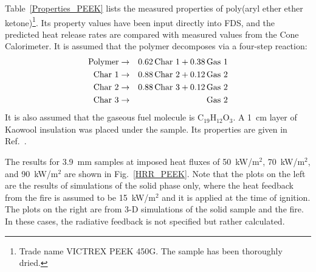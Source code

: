 Table~\ref{Properties_PEEK} lists the measured properties of poly(aryl ether ether ketone)\footnote{Trade name VICTREX PEEK 450G. The sample has been thoroughly dried.}. Its property values have been input directly into FDS, and the predicted heat release rates are compared with measured values from the Cone Calorimeter. It is assumed that the polymer decomposes via a four-step reaction:
\begin{eqnarray}
   \hbox{Polymer} &\to& 0.62 \, \hbox{Char 1} + 0.38 \, \hbox{Gas 1}  \\
   \hbox{Char 1}  &\to& 0.88 \, \hbox{Char 2} + 0.12 \, \hbox{Gas 2}  \\
   \hbox{Char 2}  &\to& 0.88 \, \hbox{Char 3} + 0.12 \, \hbox{Gas 2}  \\
   \hbox{Char 3}  &\to& \hbox{Gas 2}
\end{eqnarray}
It is also assumed that the gaseous fuel molecule is C$_{19}$H$_{12}$O$_3$. A 1~cm layer of Kaowool insulation was placed under the sample. Its properties are given in Ref.~\cite{Stoliarov:CF2010}.

The results for 3.9~mm samples at imposed heat fluxes of 50~kW/m$^2$, 70~kW/m$^2$, and 90~kW/m$^2$ are shown in Fig.~\ref{HRR_PEEK}. Note that the plots on the left are the results of simulations of the solid phase only, where the heat feedback from the fire is assumed to be 15~kW/m$^2$ and it is applied at the time of ignition. The plots on the right are from 3-D simulations of the solid sample and the fire. In these cases, the radiative feedback is not specified but rather calculated.


